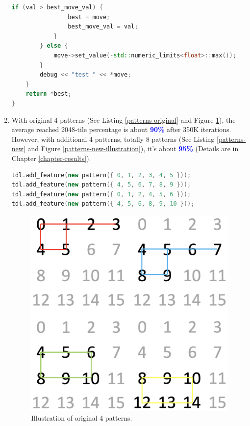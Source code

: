 \begin{enumerate}
\begin{lstlisting}[language=C++, caption={C++ code of \textcolor{blue}{select\_best\_move} function of class \textcolor{blue}{learning}.}, label={learning-select-best-move}]
			if (val > best_move_val) {
				best = move;
				best_move_val = val;
			}
		} else {
			move->set_value(-std::numeric_limits<float>::max());
		}
		debug << "test " << *move;
	}
	return *best;
}\end{lstlisting}
\pagebreak
	\item With original 4 patterns (See Listing \ref{patterns-original} and Figure \ref{patterns-org-illustration}), the average reached 2048-tile percentage is about \textcolor{blue}{\textbf{90\%}} after 350K iterations.
	However, with additional 4 patterns, totally 8 patterns (See Listing \ref{patterns-new} and Figure \ref{patterns-new-illustration}), it's about \textcolor{blue}{\textbf{95\%}} (Details are in Chapter \ref{chapter-results}).
\begin{lstlisting}[language=C++, caption={C++ code of original 4 patterns.}, label={patterns-original}]
tdl.add_feature(new pattern({ 0, 1, 2, 3, 4, 5 }));
tdl.add_feature(new pattern({ 4, 5, 6, 7, 8, 9 }));
tdl.add_feature(new pattern({ 0, 1, 2, 4, 5, 6 }));
tdl.add_feature(new pattern({ 4, 5, 6, 8, 9, 10 }));\end{lstlisting}
\begin{figure}[H]
	\centering
	\includegraphics[scale=0.4]{img/patterns-org-illustration.png}
	\caption{Illustration of original 4 patterns.}
	\label{patterns-org-illustration}
\end{figure}

\end{enumerate}
